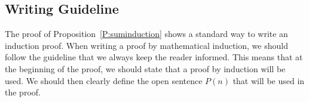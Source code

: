 \subsection*{Writing Guideline}
The proof of Proposition~\ref{P:suminduction} shows a standard way to write an induction proof.  When writing a proof by mathematical induction, we should follow the guideline that we always keep the reader informed.  This means that at the beginning of the proof, we should state that a proof by induction will be used. We should then clearly define the open sentence $P ( n )$ that will be used in the proof.
\hbreak

\endinput
